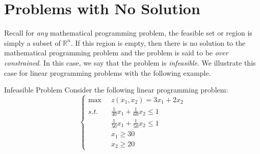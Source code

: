 \section{Problems with No Solution} 
Recall for \textit{any} mathematical programming problem, the feasible set or region is simply a subset of $\mathbb{R}^n$. If this region is empty, then there is no solution to the mathematical programming problem and the problem is said to be \textit{over constrained}. In this case, we say that the problem is \emph{infeasible}.  We illustrate this case for linear programming problems with the following example.
\begin{example}{Infeasible Problem}
 Consider the following linear programming problem:
\begin{equation}
\left\{
\begin{aligned}
\max\;\;& z(x_1,x_2) = 3x_1 + 2x_2\\
s.t.\;\;&  \frac{1}{40}x_1 + \frac{1}{60}x_2 \leq 1\\
& \frac{1}{50}x_1 + \frac{1}{50}x_2 \leq 1\\
& x_1 \geq 30\\
& x_2 \geq 20
\end{aligned}
\right.
\label{eqn:LPInfeasible}
\end{equation}
\end{example}
